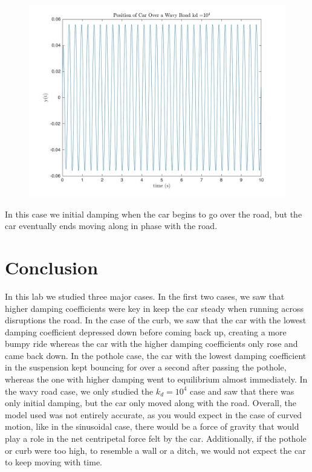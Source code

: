 \documentclass{article}
\begin{document}
\begin{figure}[!htbp]
\begin{minipage}{\linewidth}
\includegraphics[width = 1\linewidth, height = 0.5\textheight]{wavy.jpg}
\end{minipage}
\end{figure}
\FloatBarrier


In this case we initial damping when the car begins to go over the road, but the car eventually ends moving along in phase with the road. 

\section{Conclusion}
In this lab we studied three major cases. In the first two cases, we saw that higher damping coefficients were key in keep the car steady when running across disruptions the road. In the case of the curb, we saw that the car with the lowest damping coefficient depressed down before coming back up, creating a more bumpy ride whereas the car with the higher damping coefficients only rose and came back down. In the pothole case, the car with the lowest damping coefficient in the suspension kept bouncing for over a second after passing the pothole, whereas the one with higher damping went to equilibrium almost immediately. In the wavy road case, we only studied the $k_d = 10^4$ case and saw that there was only initial damping, but the car only moved along with the road. Overall, the model used was not entirely accurate, as you would expect in the case of curved motion, like in the sinusoidal case, there would be a force of gravity that would play a role in the net centripetal force felt by the car. Additionally, if the pothole or curb were too high, to resemble a wall or a ditch, we would not expect the car to keep moving with time.
\end{document}
